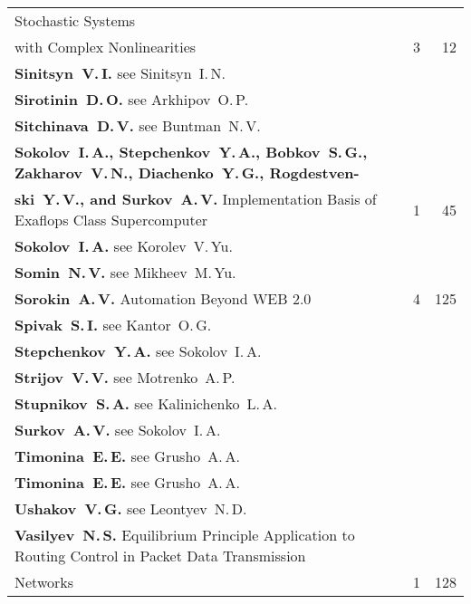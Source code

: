 {\begin{tabular}{p{397pt}rr}
Stochastic Systems\linebreak
\vspace*{-12pt}\\[0.65pt]
\hspace*{23pt}with Complex Nonlinearities\dotfill&3&12\\[0.65pt]
\textbf{Sinitsyn~V.\,I.} see Sinitsyn~I.\,N.&&\\[0.65pt]
\textbf{Sirotinin~D.\,O.} see Arkhipov~O.\,P.&&\\[0.65pt]
\textbf{Sitchinava~D.\,V.} see Buntman~N.\,V.&&\\[0.65pt]
\textbf{Sokolov~I.\,A., Stepchenkov~Y.\,A., Bobkov~S.\,G., Zakharov~V.\,N., Diachenko~Y.\,G.,
Rogdestven-}\linebreak
\vspace*{-12pt}\\[0.65pt]
\hspace*{23pt}\textbf{ski~Y.\,V., and Surkov~A.\,V.} Implementation Basis of Exaflops Class
Supercomputer\dotfill&1&45\\[0.65pt]
\textbf{Sokolov~I.\,A.} see Korolev~V.\,Yu.&&\\[0.65pt]
\textbf{Somin~N.\,V.} see Mikheev~M.\,Yu.&&\\[0.65pt]
\textbf{Sorokin~A.\,V.} Automation Beyond WEB 2.0\dotfill&4&125\\[0.65pt]
\textbf{Spivak~S.\,I.} see Kantor~O.\,G.&&\\[0.65pt]
\textbf{Stepchenkov~Y.\,A.} see Sokolov~I.\,A.&&\\[0.65pt]
\textbf{Strijov~V.\,V.} see Motrenko~A.\,P.&&\\[0.65pt]
\textbf{Stupnikov~S.\,A.} see Kalinichenko~L.\,A.&&\\[0.65pt]
\textbf{Surkov~A.\,V.} see Sokolov~I.\,A.&&\\[0.65pt]
\textbf{Timonina~E.\,E.} see Grusho~A.\,A.&&\\[0.65pt]
\textbf{Timonina~E.\,E.} see Grusho~A.\,A.&&\\[0.65pt]
\textbf{Ushakov~V.\,G.} see Leontyev~N.\,D.&&\\[0.65pt]
\textbf{Vasilyev~N.\,S.} Equilibrium Principle Application to Routing Control
in Packet Data Transmission\linebreak
\vspace*{-12pt}\\[0.65pt]
\hspace*{23pt}Networks\dotfill&1&128\\
\end{tabular}
}
\pagebreak

